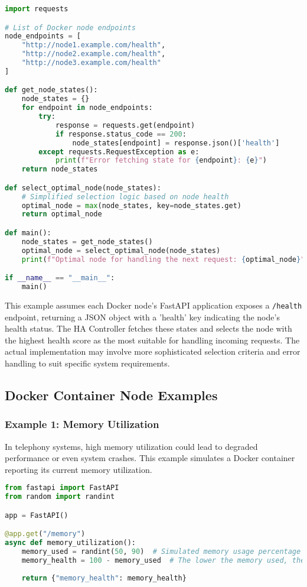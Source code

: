 \documentclass[12pt]{article}
\begin{document}
\begin{lstlisting}[language=Python, caption=HA Controller Python Example]
import requests

# List of Docker node endpoints
node_endpoints = [
    "http://node1.example.com/health",
    "http://node2.example.com/health",
    "http://node3.example.com/health"
]

def get_node_states():
    node_states = {}
    for endpoint in node_endpoints:
        try:
            response = requests.get(endpoint)
            if response.status_code == 200:
                node_states[endpoint] = response.json()['health']
        except requests.RequestException as e:
            print(f"Error fetching state for {endpoint}: {e}")
    return node_states

def select_optimal_node(node_states):
    # Simplified selection logic based on node health
    optimal_node = max(node_states, key=node_states.get)
    return optimal_node

def main():
    node_states = get_node_states()
    optimal_node = select_optimal_node(node_states)
    print(f"Optimal node for handling the next request: {optimal_node}")

if __name__ == "__main__":
    main()
\end{lstlisting}

This example assumes each Docker node's FastAPI application exposes a \texttt{/health} endpoint, returning a JSON object with a 'health' key indicating the node's health status. The HA Controller fetches these states and selects the node with the highest health score as the most suitable for handling incoming requests. The actual implementation may involve more sophisticated selection criteria and error handling to suit specific system requirements.
\subsection{Docker Container Node Examples}
\subsubsection{Example 1: Memory Utilization}

In telephony systems, high memory utilization could lead to degraded performance or even system crashes. This example simulates a Docker container reporting its current memory utilization.

\begin{lstlisting}[language=Python, caption=Memory Utilization FastAPI Application]
from fastapi import FastAPI
from random import randint

app = FastAPI()

@app.get("/memory")
async def memory_utilization():
    memory_used = randint(50, 90)  # Simulated memory usage percentage
    memory_health = 100 - memory_used  # The lower the memory used, the healthier the system
    
    return {"memory_health": memory_health}
\end{lstlisting}
\end{document}
